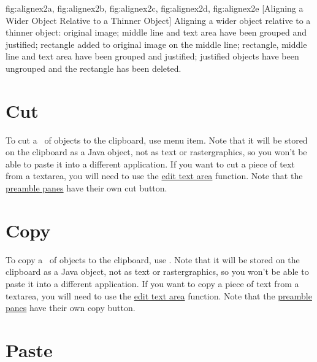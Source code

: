 {
  {fig:alignex2a}{}{},
  {fig:alignex2b}{}{},
  {fig:alignex2c}{}{},
  {fig:alignex2d}{}{},
  {fig:alignex2e}{}{}
}
[Aligning a Wider Object Relative to a Thinner Object]
{Aligning a wider object relative to a thinner object:
 original image;
 middle line and text area have
been grouped and justified;
 rectangle added to original
image  on the middle line;
 rectangle, middle line
and text area have been grouped and justified;
 justified
objects have been ungrouped and the rectangle has been deleted.}


\section{Cut}\label{sec:cutobjects}


To cut a \selection\ of \glspl{object} to the
clipboard, use  menu item. Note that it will be stored
on the clipboard as a  Java object, not as text or
\gls{rastergraphics}, so you won't be able to paste it into a different
application.  If you want to cut a piece of text
from a \gls{textarea}, you will need to use the
\hyperref[sec:edittext]{edit text area} function.
Note that the \hyperref[sec:preamble]{preamble panes} have
their own cut button.

\section{Copy}\label{sec:copyobjects}


To copy a \selection\ of \glspl{object} to the
clipboard, use . Note that it will be stored
on the clipboard as a  Java object, not as text or
\gls{rastergraphics}, so you won't be able to paste it into a different
application.  If you want to copy a piece of text from a
\gls{textarea}, you will need to use the
\hyperref[sec:edittext]{edit text area} function.
Note that the \hyperref[sec:preamble]{preamble panes} have
their own copy button.

\section{Paste}\label{sec:pasteobjects}

